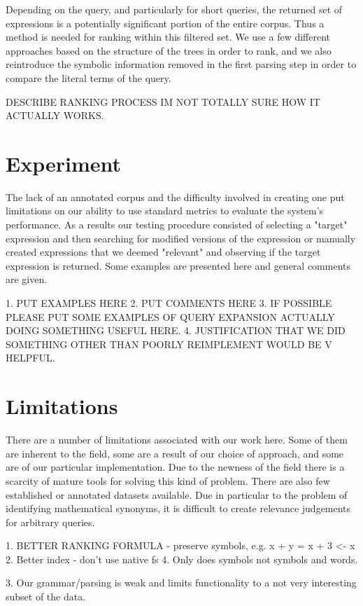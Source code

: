 \documentclass{sig-alternate}
\begin{document}
Depending on the query, and particularly for short queries, the returned set of expressions is a potentially
significant portion of the entire corpus. Thus a method is needed for ranking within this filtered set. We 
use a few different approaches based on the structure of the trees in order to rank, and we also reintroduce
the symbolic information removed in the first parsing step in order to compare the literal terms of the query.

DESCRIBE RANKING PROCESS IM NOT TOTALLY SURE HOW IT ACTUALLY WORKS.

\section{Experiment}
The lack of an annotated corpus and the difficulty involved in creating one put limitations on our ability
to use standard metrics to evaluate the system's performance. As a results our testing procedure consisted of
selecting a "target" expression and then searching for modified versions of the expression or manually created expressions that we deemed "relevant" and observing if the target expression is returned. Some examples are presented here and general comments are given. 

1. PUT EXAMPLES HERE
2. PUT COMMENTS HERE
3. IF POSSIBLE PLEASE PUT SOME EXAMPLES OF QUERY EXPANSION ACTUALLY DOING SOMETHING USEFUL HERE.
4. JUSTIFICATION THAT WE DID SOMETHING OTHER THAN POORLY REIMPLEMENT WOULD BE V HELPFUL.

\section{Limitations}
There are a number of limitations associated with our work here. Some of them are inherent to the field,
some are a result of our choice of approach, and some are of our particular implementation. Due to the newness
of the field there is a scarcity of mature tools for solving this kind of problem. There are also few 
established or annotated datasets available. Due in particular to the problem of identifying mathematical
synonyms, it is difficult to create relevance judgements for arbitrary queries. 

1. BETTER RANKING FORMULA - preserve symbols, e.g. x + y = x + 3 <- x
2. Better index - don't use native fs
4. Only does symbols not symbols and words.

3. Our grammar/parsing is weak and limits functionality to a not very interesting subset of the data.
\end{document}
